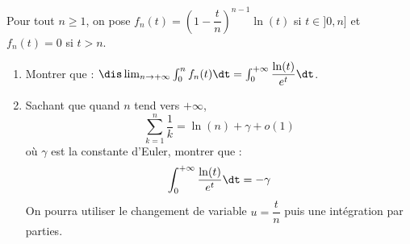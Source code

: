 \documentclass[a4paper,10pt]{report}
\begin{document}
\begin{Exercice}{}
Pour tout $n \geq 1$, on pose $f_n(t) = \left( 1 - \dfrac{t}{n} \right)^{n-1}\ln(t)$ si $t \in ]0,n]$ et $f_n(t)=0$ si $t>n$.
\begin{enumerate}
\item Montrer que : $\dis \lim_{n \rightarrow + \infty} \int_{0}^n f_n(t) \dt = \int_{0}^{+ \infty} \dfrac{\ln(t)}{e^t} \dt$.
\item Sachant que quand $n$ tend vers $+ \infty$,
$$ \sum_{k=1}^n \dfrac{1}{k} = \ln(n)+ \gamma + o(1)$$
où $\gamma$ est la constante d'Euler, montrer que :
$$ \int_{0}^{+ \infty} \dfrac{\ln(t)}{e^t} \dt = - \gamma$$
On pourra utiliser le changement de variable $u=\dfrac{t}{n}$ puis une intégration par parties.
\end{enumerate}
\end{Exercice}
\end{document}
